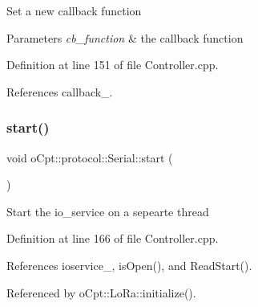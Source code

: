 Set a new callback function 
\begin{DoxyParams}{Parameters}
{\em cb\+\_\+function} & the callback function \\
\hline
\end{DoxyParams}


Definition at line 151 of file Controller.\+cpp.



References callback\+\_\+.

\hypertarget{classo_cpt_1_1protocol_1_1_serial_a6231948447729037b55df7531065749f}{}\label{classo_cpt_1_1protocol_1_1_serial_a6231948447729037b55df7531065749f} 
\subsubsection{\texorpdfstring{start()}{start()}}
{\footnotesize\ttfamily void o\+Cpt\+::protocol\+::\+Serial\+::start (\begin{DoxyParamCaption}{ }\end{DoxyParamCaption})}

Start the io\+\_\+service on a sepearte thread 

Definition at line 166 of file Controller.\+cpp.



References ioservice\+\_\+, is\+Open(), and Read\+Start().



Referenced by o\+Cpt\+::\+Lo\+Ra\+::initialize().

